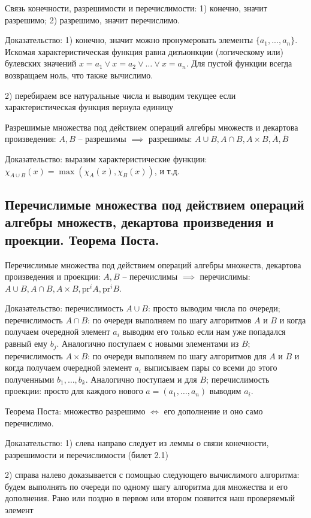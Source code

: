 \documentclass[a4paper, 10pt]{article}
\begin{document}
Связь конечности, разрешимости и перечислимости: 1) конечно, значит разрешимо; 2) разрешимо, значит перечислимо.

Доказательство: 1) конечно, значит можно пронумеровать элементы $\{a_1,...,a_n\}$. Искомая характеристическая функция равна дизъюнкции (логическому или) булевских значений $x=a_1\lor x=a_2 \lor \ldots \lor x=a_n$. Для пустой функции всегда возвращаем ноль, что также вычислимо.

2) перебираем все натуральные числа и выводим текущее если характеристическая функция вернула единицу

\hfill

Разрешимые множества под действием операций алгебры множеств и декартова произведения: $A,B$ -- разрешимы $\implies$ разрешимы: $A\cup B, A\cap B, A\times B, \overline{A}, \overline{B}$

Доказательство: выразим характеристические функции: $\chi_{A\cup B}(x)=\max(\chi_A(x),\chi_B(x))$, и т.д.

\subsection{Перечислимые множества под действием операций алгебры множеств, декартова произведения и проекции. Теорема Поста.}

Перечислимые множества под действием операций алгебры множеств, декартова произведения и проекции: $A,B$ -- перечислимы $\implies$ перечислимы: $A\cup B, A\cap B, A\times B, \text{pr}^i A, \text{pr}^i B$.

Доказательство: перечислимость $A\cup B$: просто выводим числа по очереди; перечислимость $A\cap B$: по очереди выполняем по шагу алгоритмов $A$ и $B$ и когда получаем очередной элемент $a_i$ выводим его только если нам уже попадался равный ему $b_j$. Аналогично поступаем с новыми элементами из $B$; перечислимость $A\times B$: по очереди выполняем по шагу алгоритмов для $A$ и $B$ и когда получаем очередной элемент $a_i$ выписываем пары со всеми до этого полученными $b_1,\ldots,b_k$. Аналогично поступаем и для $B$; перечислимость проекции: просто для каждого нового $a=(a_1,\ldots,a_n)$ выводим $a_i$.

\hfill

Теорема Поста: множество разрешимо $\iff$ его дополнение и оно само перечислимо.

Доказательство: 1) слева направо следует из леммы о связи конечности, разрешимости и перечислимости (билет 2.1)

2) справа налево доказывается с помощью следующего вычислимого алгоритма: будем выполнять по очереди по одному шагу алгоритма для множества и его дополнения. Рано или поздно в первом или втором появится наш проверяемый элемент
\end{document}
